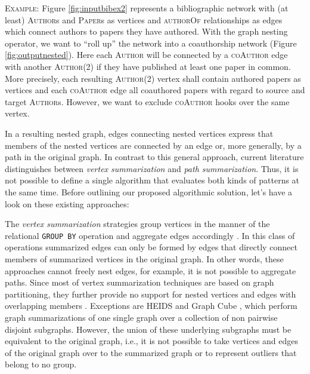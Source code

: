 \begin{em}
 \textsc{Example}:  Figure \ref{fig:inputbibex2} represents a bibliographic network with (at least) \textsc{Author}s and \textsc{Paper}s as vertices and \textsc{authorOf} relationships as edges which connect authors to papers they have authored. With the graph nesting operator, we want to ``roll up'' the network into a coauthorship network (Figure \ref{fig:outputnested}). Here each \textsc{Author} will be connected by a \textsc{coAuthor} edge with another \textsc{Author}(2) if they have published at least one paper in common.
 More precisely, each resulting \textsc{Author}(2) vertex shall contain authored papers as vertices and each \textsc{coAuthor} edge all coauthored papers with regard to source and target \textsc{Author}s. However, we want to exclude \textsc{coAuthor} hooks over the same vertex.
\end{em}

In a resulting nested graph, edges connecting nested vertices express that members of the nested vertices are connected by an edge or, more generally, by a path in the original graph.
In contrast to this general approach, current literature distinguishes between \textit{vertex summarization} and \textit{path summarization}. Thus, it is not possible to define a single algorithm that evaluates both kinds of patterns at the same time. Before outlining our proposed algorithmic solution, let's have a look on these existing approaches:

The \textit{vertex summarization} strategies group vertices in the manner of the relational \texttt{GROUP BY} operation and aggregate edges accordingly \cite{JunghannsPR17}. In this class of operations summarized edges can only be formed by edges that directly connect members of summarized vertices in the original graph. In other words, these approaches cannot freely nest edges, for example, it is not possible to aggregate paths. Since most of vertex summarization techniques are based on graph partitioning, they further provide no support for nested vertices and edges with overlapping members \cite{yin,Tian20085,jakawat}.
Exceptions are HEIDS \cite{ChengJQ16} and Graph Cube \cite{Zhao11}, which perform graph summarizations of one single graph over a collection of non pairwise disjoint subgraphs. However, the union of these underlying subgraphs must be equivalent to the original graph, i.e., it is not possible to take vertices and edges of the original graph over to the summarized graph or to represent outliers that belong to no group.

